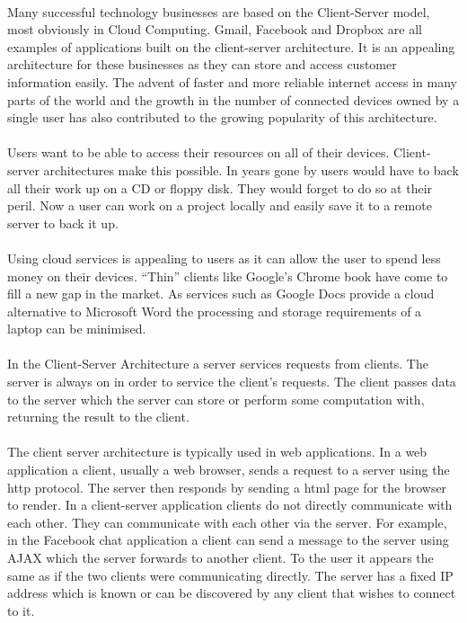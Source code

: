 \documentclass[11pt]{amsart}
\begin{document}
\paragraph{}
Many successful technology businesses are based on the Client-Server model, most obviously in Cloud Computing. Gmail, Facebook and Dropbox are all examples of applications built on the client-server architecture. It is an appealing architecture for these businesses as they can store and access customer information easily. The advent of faster and more reliable internet access in many parts of the world and the growth in the number of connected devices owned by a single user has also contributed to the growing popularity of this architecture. 
\paragraph{}
Users want to be able to access their resources on all of their devices. Client-server architectures make this possible. In years gone by users would have to back all their work up on a CD or floppy disk. They would forget to do so at their peril. Now a user can work on a project locally and easily save it to a remote server to back it up.
\paragraph{}
Using cloud services is appealing to users as it can allow the user to spend less money on their devices. ``Thin'' clients like Google's Chrome book have come to fill a new gap in the market. As services such as Google Docs provide a cloud alternative to Microsoft Word the processing and storage requirements of a laptop can be minimised.
\paragraph{}
In the Client-Server Architecture a server services requests from clients. The server is always on in order to service the client's requests. The client passes data to the server which the server can store or perform some computation with, returning the result to the client.
\paragraph{}
The client server architecture is typically used in web applications. In a web application a client, usually a web browser, sends a request to a server using the http protocol. The server then responds by sending a html page for the browser to render. In a client-server application clients do not directly communicate with each other. They can communicate with each other via the server. For example, in the Facebook chat application a client can send a message to the server using AJAX which the server forwards to another client. To the user it appears the same as if the two clients were communicating directly. The server has a fixed IP address which is known or can be discovered by any client that wishes to connect to it.
\end{document}
